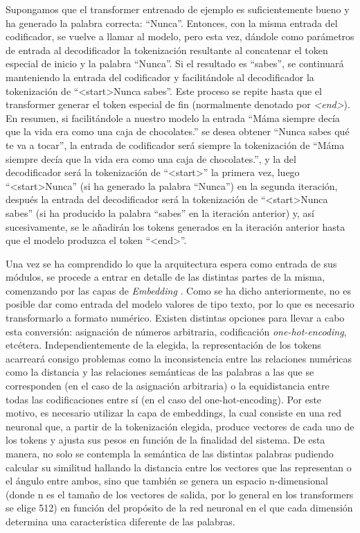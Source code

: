 Supongamos que el transformer entrenado de ejemplo es suficientemente bueno y ha generado la palabra correcta: ``Nunca''. Entonces, con la misma entrada del codificador, se vuelve a llamar al modelo, pero esta vez, dándole como parámetros de entrada al decodificador la tokenización resultante al concatenar el token especial de inicio y la palabra ``Nunca''. Si el resultado es ``sabes'', se continuará manteniendo la entrada del codificador y facilitándole al decodificador la tokenización de ``<start>Nunca sabes''. Este proceso se repite hasta que el transformer generar el token especial de fin (normalmente denotado por \textit{<end>}). En resumen, si facilitándole a nuestro modelo la entrada ``Máma siempre decía que la vida era como una caja de chocolates.'' se desea obtener ``Nunca sabes qué te va a tocar'', la entrada de codificador será siempre la tokenización de ``Máma siempre decía que la vida era como una caja de chocolates.'', y la del decodificador será la tokenización de ``<start>'' la primera vez, luego ``<start>Nunca'' (si ha generado la palabra ``Nunca'') en la segunda iteración, después la entrada del decodificador será la tokenización de ``<start>Nunca sabes'' (si ha producido la palabra ``sabes'' en la iteración anterior) y, así sucesivamente, se le añadirán los tokens generados en la iteración anterior hasta que el modelo produzca el token ``<end>''.

Una vez se ha comprendido lo que la arquitectura espera como entrada de sus módulos, se procede a entrar en detalle de las distintas partes de la misma, comenzando por las capas de \textit{Embedding} \citep{mikolov2013efficient}. Como se ha dicho anteriormente, no es posible dar como entrada del modelo valores de tipo texto, por lo que es necesario transformarlo a formato numérico. Existen distintas opciones para llevar a cabo esta conversión: asignación de números arbitraria, codificación \textit{one-hot-encoding}, etcétera. Independientemente de la elegida, la representación de los tokens acarreará consigo problemas como la inconsistencia entre las relaciones numéricas como la distancia y las relaciones semánticas de las palabras a las que se corresponden (en el caso de la asignación arbitraria) o la equidistancia entre todas las codificaciones entre sí (en el caso del one-hot-encoding). Por este motivo, es necesario utilizar la capa de embeddings, la cual consiste en una red neuronal que, a partir de la tokenización elegida, produce vectores de cada uno de los tokens y ajusta sus pesos en función de la finalidad del sistema. De esta manera, no solo se contempla la semántica de las distintas palabras pudiendo calcular su similitud hallando la distancia entre los vectores que las representan o el ángulo entre ambos, sino que también se genera un espacio n-dimensional (donde n es el tamaño de los vectores de salida, por lo general en los transformers se elige 512) en función del propósito de la red neuronal en el que cada dimensión determina una característica diferente de las palabras.

